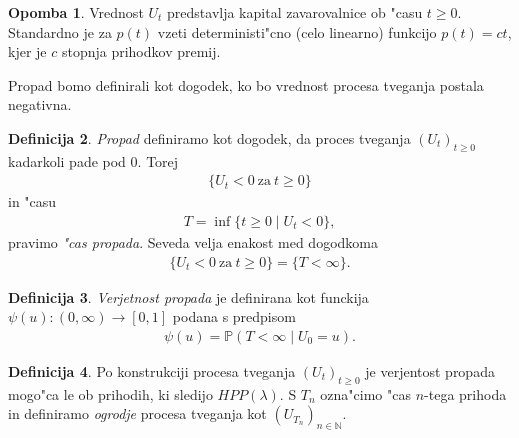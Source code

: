 \documentclass[12pt, a4paper, reqno]{amsart}
\theoremstyle{definition} %
\newtheorem{definicija}{Definicija}[section]
\newtheorem{opomba}[definicija]{Opomba}
\theoremstyle{plain} %
\newcommand{\N}{\mathbb{N}}
\newcommand{\Prob}{\mathbb{P}}
\newcommand{\1}{\mathds{1}}
\begin{document}
        \begin{opomba}
            Vrednost $U_t$ predstavlja kapital zavarovalnice ob "casu $t\geq0$. Standardno je za $p(t)$ 
            vzeti deterministi"cno (celo linearno) funkcijo $p(t) = ct$, kjer je $c$ stopnja prihodkov premij.
            \label{op:procesTveganja}
        \end{opomba}

        Propad bomo definirali kot dogodek, ko bo vrednost procesa tveganja postala negativna.

        \begin{definicija}
            \textit{Propad} definiramo kot dogodek, da proces tveganja $(U_t)_{t\geq0}$ kadarkoli pade pod $0$. 
            Torej 
            \begin{align*}
                \bigl\{U_t<0 \ \text{za} \ t\geq 0\bigr\}
            \end{align*}
            in "casu
            \begin{align*}
                T = \inf\{t\geq0 \mid U_t < 0\}, 
            \end{align*}
            pravimo \textit{"cas propada}. Seveda velja enakost med dogodkoma
            \begin{align*}
                \{U_t<0 \ \text{za} \ t\geq0\} = \{T<\infty\}.
            \end{align*}
            \label{def:PropadCasPropada} 
        \end{definicija}

        \begin{definicija}
            \textit{Verjetnost propada} je definirana kot funckija $\psi(u): (0,\infty) \to [0,1]$ 
            podana s predpisom
            \begin{align*}
                \psi(u) = \Prob(T<\infty \mid U_0 = u).
            \end{align*}
            \label{def:VerjetnostPropada}
        \end{definicija}

        \begin{definicija}
            Po konstrukciji procesa tveganja $(U_t)_{t\geq0}$ je verjentost propada mogo"ca le ob 
            prihodih, ki sledijo $HPP(\lambda).$ S $T_n$ ozna"cimo "cas $n$-tega prihoda in definiramo 
            \textit{ogrodje} procesa tveganja kot $(U_{T_n})_{n\in\N}$.
            \label{def:ogrodjeProcesaTveganja}
        \end{definicija}
\end{document}
